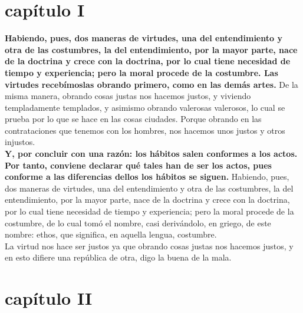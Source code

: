 \begin{multicols}{2}

\section*{capítulo I}
\textbf{Habiendo, pues, dos maneras de virtudes, una del entendimiento y otra de las costumbres, la del entendimiento, por la mayor parte, nace de la doctrina y crece con la doctrina, por lo cual tiene necesidad de tiempo y experiencia; pero la moral procede de la costumbre. Las virtudes recebímoslas obrando primero, como en las demás artes.} De la misma manera, obrando cosas justas nos hacemos justos, y viviendo templadamente templados, y asimismo obrando valerosas valerosos, lo cual se prueba por lo que se hace en las cosas ciudades. Porque obrando en las contrataciones que tenemos con los hombres, nos hacemos unos justos y otros injustos.\\
\textbf{Y, por concluir con una razón: los hábitos salen conformes a los actos. Por tanto, conviene declarar qué tales han de ser los actos, pues conforme a las diferencias dellos los hábitos se siguen.}
Habiendo, pues, dos maneras de virtudes, una del entendimiento y otra de las costumbres, la del entendimiento, por la mayor parte, nace de la doctrina y crece con la doctrina, por lo cual tiene necesidad de tiempo y experiencia; pero la moral procede de la costumbre, de lo cual tomó el nombre, casi derivándolo, en griego, de este nombre: ethos, que significa, en aquella lengua, costumbre.\\
La virtud nos hace ser justos ya que obrando cosas justas nos hacemos justos, y en esto difiere una república de otra, digo la buena de la mala.

\section*{capítulo II}



\end{multicols}

